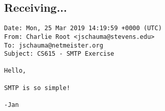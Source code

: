 \documentclass[xga]{xdvislides}
\begin{document}
%
%
%
%

\subsection{Receiving...}
\begin{verbatim}
Date: Mon, 25 Mar 2019 14:19:59 +0000 (UTC)                                                         
From: Charlie Root <jschauma@stevens.edu>                                                           
To: jschauma@netmeister.org                                                                         
Subject: CS615 - SMTP Exercise                                                                      

Hello,

SMTP is so simple!

-Jan
\end{verbatim}
\end{document}
